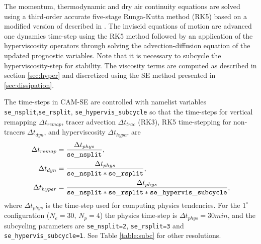 \documentclass{agujournal}
\begin{document}
{The momentum, thermodynamic and dry air continuity equations are solved using a third-order accurate five-stage Runga-Kutta method (RK5) based on a modified version of \cite{KG1984MCSb,KG1984MCS} described in \cite{GU2016GMD}. The inviscid equations of motion are advanced one dynamics time-step using the RK5 method followed by an application of the hyperviscosity operators through solving the advection-diffusion equation of the updated prognostic variables. Note that it is necessary to subcycle the hyperviscosity-step for stability. The viscosity terms are computed as described in section \ref{sec:hyper} and discretized using the SE method presented in \ref{sec:dissipation}.

{\color{red}{[Mark: How is tracer advection coupled to dry air continuity equation??]}} 

The time-steps in CAM-SE are controlled with namelist variables {\tt{se\_nsplit}},{\tt{se\_rsplit}},
{\tt{se\_hypervis\_subcycle}}  so that the time-steps for vertical remapping $\Delta t_{remap}$, tracer advection $\Delta t_{trac}$ (RK3), RK5 time-stepping for non-tracers $\Delta t_{dyn}$, and hyperviscosity $\Delta t_{hyper}$ are
\begin{align}
\Delta t_{remap}&=\frac{\Delta t_{phys}}{\tt{se\_nsplit}},\\
\Delta t_{dyn}&=\frac{\Delta t_{phys}}{\tt{se\_nsplit*se\_rsplit}},\\
\Delta t_{hyper}&=\frac{\Delta t_{phys}}{\tt{se\_nsplit*se\_rsplit*se\_hypervis\_subcycle}},\\
\end{align}
where $\Delta t_{phys}$ is the time-step used for computing physics tendencies. For the $1^\circ$ configuration ($N_e=30$, $N_p=4$) the physics time-step is $\Delta t_{phys}=30 min$, and the subcycling parameters are {\tt{se\_nsplit}=2}, {\tt{se\_rsplit=3}} and {\tt{se\_hypervis\_subcycle=1}}. See Table \ref{table:subc} for other resolutions.

}
\end{document}

